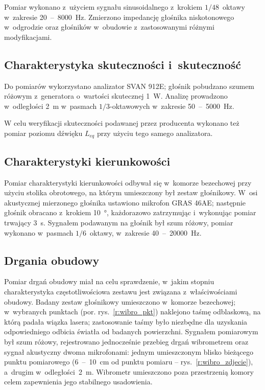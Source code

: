 \documentclass[12pt]{oska}
\newcommand{\range}[2]{\num{#1}~--~\num{#2}}
\begin{document}
	
	Pomiar wykonano z~użyciem sygnału sinusoidalnego z~krokiem $1/48$~oktawy w~zakresie \range{20}{8000}~\si{\hertz}. Zmierzono impedancję głośnika niskotonowego w~odgrodzie oraz głośników w~obudowie z~zastosowanymi różnymi modyfikacjami. 
	
	\subsection{Charakterystyka skuteczności i~skuteczność}
	
	Do pomiarów wykorzystano analizator SVAN 912E; głośnik pobudzano szumem różowym z~generatora o~wartości skutecznej \SI{1}{\watt}. Analizę prowadzono w~odległości \SI{2}{\metre} w~pasmach $1/3$-oktawowych w~zakresie \range{50}{5000}~\si{\hertz}.
	
	W celu weryfikacji skuteczności podawanej przez producenta wykonano też pomiar poziomu dźwięku $L_{eq}$ przy użyciu tego samego analizatora. 
	
	\subsection{Charakterystyki kierunkowości}
	
	
	Pomiar charakterystyki kierunkowości odbywał się w~komorze bezechowej przy użyciu stolika obrotowego, na którym umieszczony był zestaw głośnikowy. W~osi akustycznej mierzonego głośnika ustawiono mikrofon GRAS 46AE; następnie głośnik obracano z~krokiem \SI{10}{\degree}, każdorazowo zatrzymując i~wykonując pomiar trwający \SI{3}{\s}. Sygnałem podawanym na głośnik był szum różowy, pomiar wykonano w~pasmach $1/6$~oktawy, w~zakresie \range{40}{20000}~\si{\hertz}.
	
	\subsection{Drgania obudowy}
	
	Pomiar drgań obudowy miał na celu sprawdzenie, w~jakim stopniu charakterystyka częstotliwościowa zestawu jest związana z~właściwościami obudowy. Badany zestaw głośnikowy umieszczono w~komorze bezechowej; w~wybranych punktach (por. rys.~\ref{r:wibro_pkt}) naklejono taśmę odblaskową, na którą padała wiązka lasera; zastosowanie taśmy było niezbędne dla uzyskania odpowiedniego odbicia światła od badanych powierzchni. %
	Sygnałem pomiarowym był szum różowy, rejestrowano jednocześnie przebieg drgań wibrometrem oraz sygnał akustyczny dwoma mikrofonami: jednym umieszczonym blisko bieżącego punktu pomiarowego (\range{6}{10}~\si{\cm} od punktu pomiaru -- rys.~\ref{r:wibro_zdjecie}), a~drugim w~odległości~\SI{2}{\metre}. Wibrometr umieszczono poza przestrzenią komory celem zapewnienia jego stabilnego usadowienia.
	
\end{document}
